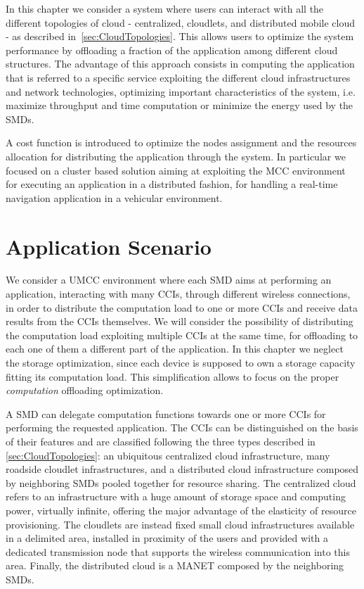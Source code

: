 \documentclass[twoside,openright]{report}
\begin{document}
In this chapter we consider a system where users can interact with all the different topologies of cloud - centralized, cloudlets, and distributed mobile cloud - as described in~\autoref{sec:CloudTopologies}. This allows users to optimize the system performance by offloading a fraction of the application among different cloud structures.  
The advantage of this approach consists in computing the application that is referred to a specific service exploiting the different cloud infrastructures and network technologies, optimizing important characteristics of the system, i.e. maximize throughput and time computation or minimize the energy used by the \glspl{SMD}. 

A cost function is introduced to optimize the nodes assignment and the resources allocation for distributing the application through the system. 
In particular we focused on a cluster based solution aiming at exploiting the \gls{MCC} environment for executing an application in a distributed fashion, for handling a real-time navigation application in a vehicular environment. 
 
\section{Application Scenario}
\label{sec:network-scenario}
We consider a \gls{UMCC} environment where each \gls{SMD} aims at performing an application, interacting with many \glspl{CCI}, through different wireless connections, in order to distribute the computation load to one or more \glspl{CCI} and receive data results from the \glspl{CCI} themselves. 
We will consider the possibility of distributing the computation load exploiting multiple \glspl{CCI} at the same time, for offloading to each one of them a different part of the application.
In this chapter we neglect the storage optimization, since each device is supposed to own a storage capacity fitting its computation load. This simplification allows to focus on the proper \emph{computation} offloading optimization.

A \gls{SMD} can delegate computation functions towards one or more \glspl{CCI} for performing the requested application.
The \glspl{CCI} can be distinguished on the basis of their features and are classified following the three types described in \autoref{sec:CloudTopologies}: an ubiquitous centralized cloud infrastructure, many roadside cloudlet infrastructures, and a distributed cloud infrastructure composed by neighboring \glspl{SMD} pooled together for resource sharing. The centralized cloud refers to an infrastructure with a huge amount of storage space and computing power, virtually infinite, offering the major advantage of the elasticity of resource provisioning. The cloudlets are instead fixed small cloud infrastructures available in a delimited area, installed in proximity of the users and provided with a dedicated transmission node that supports the wireless communication into this area. Finally, the distributed cloud is a \gls{MANET} composed by the neighboring \glspl{SMD}. 
\end{document}
